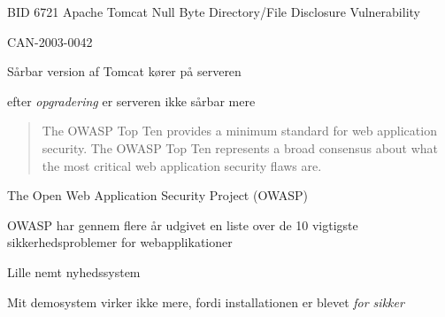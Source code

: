 \documentclass[20pt,landscape,a4paper,footrule]{foils}
\begin{document}


\begin{list1}
\item BID 6721 Apache Tomcat Null Byte Directory/File Disclosure Vulnerability
\item {}
\item CAN-2003-0042
\end{list1}




\centerline{Sårbar version af Tomcat kører på serveren}



\centerline{efter \emph{opgradering} er serveren ikke sårbar mere}



\begin{quote}
The OWASP Top Ten provides a minimum standard for web application
security. The OWASP Top Ten represents a broad consensus about what
the most critical web application security flaws are.
\end{quote}

\begin{list1}
\item The Open Web Application Security Project (OWASP)
\item OWASP har gennem flere år udgivet en liste over de 10 vigtigste
  sikkerhedsproblemer for webapplikationer
\item {}
\end{list1}






\centerline{Lille nemt nyhedssystem}

Mit demosystem virker ikke mere, fordi installationen er blevet \emph{for sikker}


\end{document}
